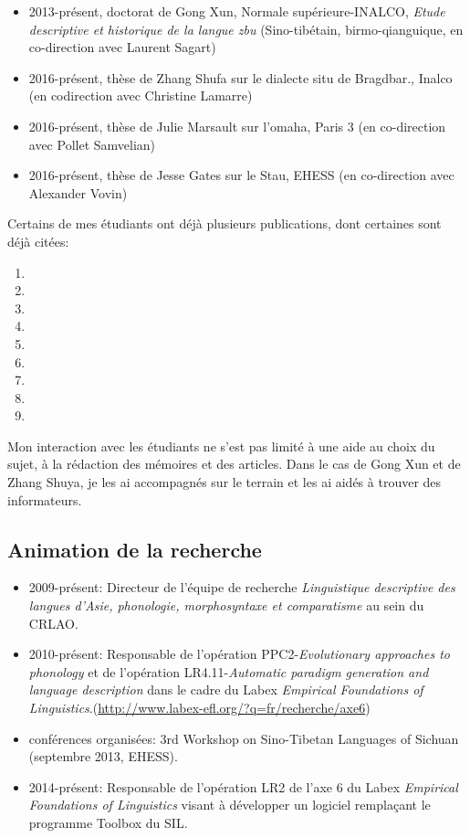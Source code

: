\documentclass[oldfontcommands,oneside,a4paper,11pt]{article}
\begin{document}
\begin{itemize}
\item 2013-présent, doctorat de Gong Xun, Normale supérieure-INALCO, \textit{Etude descriptive et historique de la langue zbu} (Sino-tibétain, birmo-qianguique, en co-direction avec Laurent Sagart)
\item 2016-présent, thèse de Zhang Shufa sur le dialecte situ de Bragdbar., Inalco (en codirection avec Christine Lamarre)
\item 2016-présent, thèse de Julie Marsault sur l'omaha, Paris 3 (en co-direction avec Pollet Samvelian)
\item 2016-présent, thèse de Jesse Gates sur le Stau, EHESS (en co-direction avec Alexander Vovin)
\end{itemize}

Certains de mes étudiants ont déjà plusieurs publications, dont certaines sont déjà citées:

\begin{enumerate}
  \item {}
  \item {}
  \item {}
  \item {}
    \item {}
    \item {}
 \item  {}
 \item  {}
 \item {} 
\end{enumerate}

Mon interaction avec les étudiants ne s'est pas limité à une aide au choix du sujet, à la rédaction des mémoires et des articles. Dans le cas de Gong Xun et de Zhang Shuya, je les ai accompagnés sur le terrain et les ai aidés à trouver des informateurs.

\subsection{Animation de la recherche}
\begin{itemize}
\item 2009-présent: Directeur de l'équipe de recherche \textit{Linguistique descriptive des langues d’Asie, phonologie, morphosyntaxe et comparatisme} au sein du CRLAO.
\item 2010-présent: Responsable de l'opération PPC2-\textit{Evolutionary approaches to phonology} et de l'opération LR4.11-\textit{Automatic paradigm generation and language description} dans le cadre du Labex \textit{Empirical Foundations of Linguistics}.(\url{http://www.labex-efl.org/?q=fr/recherche/axe6})
\item conférences organisées:  3rd Workshop on Sino-Tibetan Languages of Sichuan (septembre 2013, EHESS).
\item  2014-présent: Responsable de l'opération LR2 de l'axe 6 du Labex \textit{Empirical Foundations of Linguistics} visant à développer un logiciel remplaçant le programme Toolbox du SIL.
\end{itemize}
\end{document}
